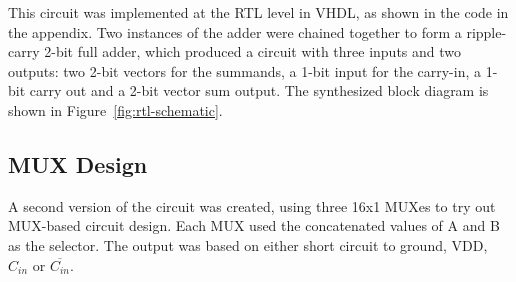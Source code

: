 \documentclass{article}
\begin{document}
This circuit was implemented at the RTL level in VHDL, as shown in the code in the appendix.
Two instances of the adder were chained together to form a ripple-carry 2-bit full adder,
which produced a circuit with three inputs and two outputs: two 2-bit vectors for the summands,
a 1-bit input for the carry-in, a 1-bit carry out and a 2-bit vector sum output.
The synthesized block diagram is shown in Figure~\ref{fig:rtl-schematic}.

\subsection{MUX Design}

A second version of the circuit was created, using three 16x1 MUXes to try out MUX-based circuit design.
Each MUX used the concatenated values of A and B as the selector.
The output was based on either short circuit to ground, VDD, $C_{in}$ or $\overline{C_{in}}$.
\end{document}
